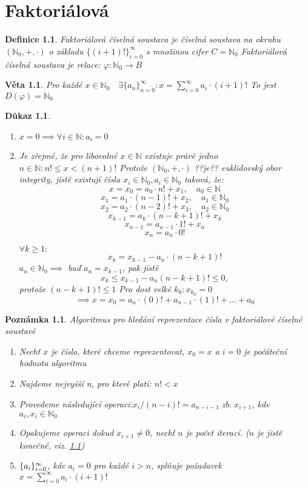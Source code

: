 \documentclass[12pt]{book}
\newtheorem{definice}{Definice}
\newtheorem{veta}{Věta}
\newtheorem*{dukaz}{Důkaz}
\newtheorem{pozn}{Poznámka}
\begin{document}
\chapter{Faktoriálová}

\begin{definice}
	Faktoriálová číselná soustava je číselná soustava na okruhu $(\mathbb{N}_0,+,\cdot)$ o základu $\{(i+1)!\}_{i=0}^\infty$ s množinou cifer $C=\mathbb{N}_0$\newline
	\newline
	Faktoriálová číselná soustava je relace:
	$\varphi:\mathbb{N}_0\to B$
\end{definice}

\begin{veta}
	Pro každé $x \in \mathbb{N}_0 \quad \exists\{a_n\}_{n=0}^\infty:x=
	 \sum_{i=0}^{\infty}a_i\cdot(i+1)!$
	To jest $D(\varphi)=\mathbb{N}_0$
\end{veta}
\begin{dukaz}\label{faktDF}
	\begin{enumerate}
		\item[$\alpha)$] $x=0 \implies \forall i \in \mathbb{N}:a_i=0$
		\item[$\beta)$] Je zřejmé, že pro libovolné $x \in \mathbb{N}$ existuje právě jedno $n\in\mathbb{N}:n!\le x<(n+1)!$\newline
		Protože $(\mathbb{N}_0,+,\cdot)$ ??je?? euklidovský obor integrity, jistě existují čísla $x_i\in\mathbb{N}_0, a_i\in\mathbb{N}_0$ taková, že:
		$$ x = x_0 = a_0 \cdot n! + x_1,\quad a_0 \in \mathbb{N}$$
		$$ x_1 = a_1 \cdot(n-1)! + x_2,\quad a_1 \in \mathbb{N}_0$$
		$$ x_2 = a_2 \cdot(n-2)! + x_3,\quad a_2 \in \mathbb{N}_0$$
		$$ x_{k-1} = a_k \cdot (n-k+1)! + x_{k}$$
		$$ x_{n-1} = a_{n-1} \cdot 1! + x_{n}$$
		$$ x_{n} = a_{n} \cdot 0!$$
		
		$\forall k \ge 1:$
		$$x_k=x_{k-1}-a_n\cdot(n-k+1)!$$
		$a_n \in \mathbb{N}_0 \implies$ buď $a_n = x_{k-1}$, pak jistě
		$$x_k \le x_{k-1}-a_n(n-k+1)! \le 0,$$
		protože $(n-k+1)! \le 1$\newline
		Pro dost velké $k_0: x_{k_0} = 0$
		$$\implies x = x_0 = a_n\cdot(0)!+a_{n-1}\cdot(1)!+\dots+a_0$$
	\end{enumerate}
\end{dukaz}
\begin{pozn} Algoritmus pro hledání reprezentace čísla v faktoriálové číselné soustavě
	\begin{enumerate}
		\item Nechť $x$ je číslo, které chceme reprezentovat, $x_0 = x$ a $i=0$ je počáteční hodnota algoritmu
		\item Najdeme nejvyšší n, pro které platí: $n! < x$		
		\item Provedeme následující operaci:\newline $x_i/(n-i)!=a_{n-i-1}\;zb.\;x_{i+1}$, kde $ a_i,x_i\in\mathbb{N}_0$
		\item Opakujeme operaci dokud $x_{i+1}\ne0$, nechť $n$ je počet iterací. ($n$ je jistě konečné, viz. \ref{faktDF})
		\item $\{a_i\}_{i=0}^{\infty}$, kde $a_i=0$ pro každé $i>n$, splňuje požadavek $x=
		\sum_{i=0}^{\infty}a_i\cdot(i+1)!$
	\end{enumerate}
\end{pozn}
\end{document}

